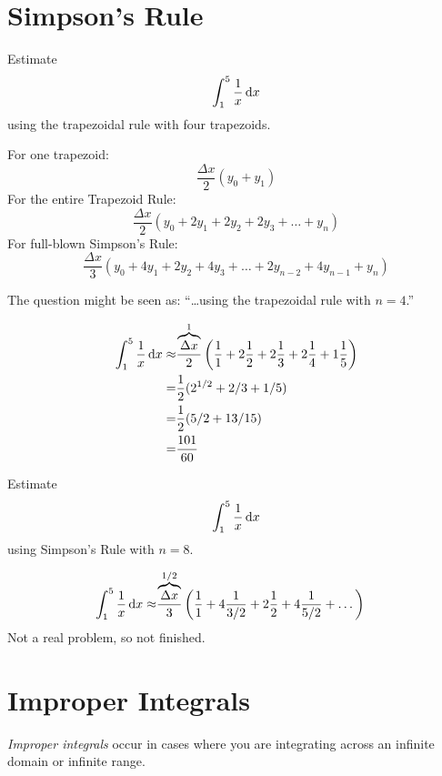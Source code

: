 \section{Simpson's Rule}
\begin{ex}
  Estimate
  \[ \int^5_1 \frac{1}{x}\,\mathrm{d} x \]
  using the trapezoidal rule with four trapezoids.
  \begin{remark}
    For one trapezoid:
      \[ \frac{\Delta x}{2}(y_0+y_1) \]
    For the entire Trapezoid Rule:
      \[ \frac{\Delta x}{2}(y_0+2y_1+2y_2+2y_3+\dots+y_n) \]
    For full-blown Simpson's Rule:
      \[ \frac{\Delta x}{3}(y_0+4y_1+2y_2+4y_3+ \dots +2y_{n-2}+ 4y_{n-1}+y_n) \]
  \end{remark}
  \begin{remark}
    The question might be seen as: ``\dots using the trapezoidal rule with $n=4$.''
  \end{remark}
  \begin{sol}
  \begin{align*}
    \int^5_1 \frac{1}{x}\,\mathrm{d} x
      \approx & \frac{\overbrace{\Delta x}^1}{2}
        \left(\frac{1}{1}+2 \frac{1}{2}+2 \frac{1}{3}+ 2 \frac{1}{4}+1 \frac{1}{5}\right)
        \\
      =& \frac{1}{2}(2^{1/2}+2/3+1/5) \\
      =& \frac{1}{2}(5/2+13/15) \\
      =& \frac{101}{60}
  \end{align*}
\end{sol}
\end{ex}
\begin{ex}
  Estimate
  \[ \int^5_1 \frac{1}{x}\,\mathrm{d} x \]
  using Simpson's Rule with $n=8$.

  \begin{sol}
  \begin{align*}
  \int^5_1 \frac{1}{x}\,\mathrm{d} x
   \approx & \frac{\overbrace{\Delta x}^{1/2}}{3}
     \left(\frac{1}{1}+4 \frac{1}{3/2}+2 \frac{1}{2} + 4 \frac{1}{5/2}+ \dots \right)
  \end{align*}
  Not a real problem, so not finished.
\end{sol}
\end{ex}


\section{Improper Integrals}

\begin{defn}
\emph{Improper integrals} occur in cases where you are integrating across an infinite domain or infinite range.
\end{defn}

